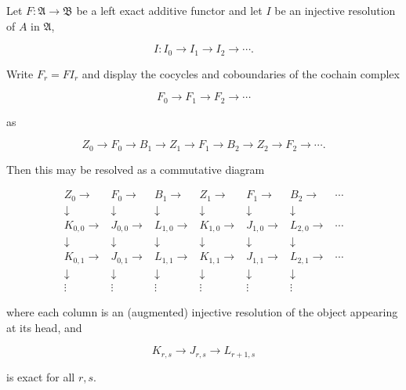 Let $F: \mathfrak{A} \to \mathfrak{B}$ be a left exact additive functor and let $I$ be an injective resolution of $A$ in $\mathfrak{A}$,

$$I: I_0 \to I_1 \to I_2 \to \cdots.$$

Write $F_r = FI_r$ and display the cocycles and coboundaries of the cochain complex

$$F_0 \to F_1 \to F_2 \to \cdots$$

as

$$Z_0 \to F_0 \to B_1 \to Z_1 \to F_1 \to B_2 \to Z_2 \to F_2 \to \cdots.$$

Then this may be resolved as a commutative diagram

$$
\begin{array}{cccccccc}
Z_0 \to & F_0 \to & B_1 \to & Z_1 \to & F_1 \to & B_2 \to & \cdots \\
\downarrow & \downarrow & \downarrow & \downarrow & \downarrow & \downarrow & \\
K_{0,0} \to & J_{0,0} \to & L_{1,0} \to & K_{1,0} \to & J_{1,0} \to & L_{2,0} \to & \cdots \\
\downarrow & \downarrow & \downarrow & \downarrow & \downarrow & \downarrow & \\
K_{0,1} \to & J_{0,1} \to & L_{1,1} \to & K_{1,1} \to & J_{1,1} \to & L_{2,1} \to & \cdots \\
\downarrow & \downarrow & \downarrow & \downarrow & \downarrow & \downarrow & \\
\vdots & \vdots & \vdots & \vdots & \vdots & \vdots &
\end{array}
$$

where each column is an (augmented) injective resolution of the object appearing at its head, and

$$K_{r,s} \to J_{r,s} \to L_{r+1,s}$$

is exact for all $r, s$.

